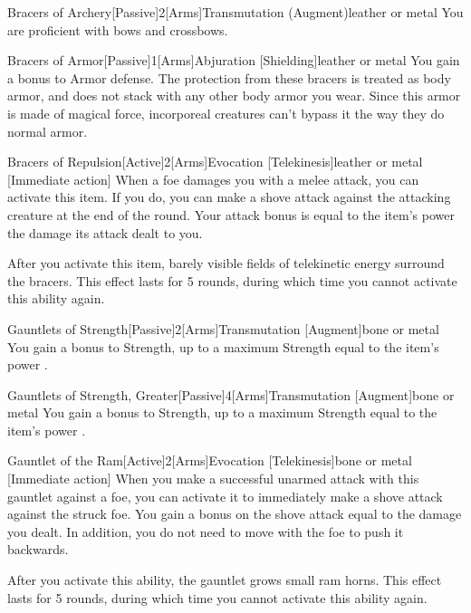 \begin{magicitemdef}{Bracers of Archery}[Passive]{2}[Arms]{Transmutation (Augment)}{leather or metal}
     You are proficient with bows and crossbows.
\end{magicitemdef}

\begin{magicitemdef}{Bracers of Armor}[Passive]{1}[Arms]{Abjuration [Shielding]}{leather or metal}
     You gain a  bonus to Armor defense.
    The protection from these bracers is treated as body armor, and does not stack with any other body armor you wear.
    Since this armor is made of magical force, incorporeal creatures can't bypass it the way they do normal armor.
\end{magicitemdef}

\begin{magicitemdef}{Bracers of Repulsion}[Active]{2}[Arms]{Evocation [Telekinesis]}{leather or metal}
    [Immediate action] When a foe damages you with a melee attack, you can activate this item.
    If you do, you can make a shove attack against the attacking creature at the end of the round.
    Your attack bonus is equal to the item's power \add the damage its attack dealt to you.

    After you activate this item, barely visible fields of telekinetic energy surround the bracers.
    This effect lasts for 5 rounds, during which time you cannot activate this ability again.
\end{magicitemdef}

\begin{magicitemdef}{Gauntlets of Strength}[Passive]{2}[Arms]{Transmutation [Augment]}{bone or metal}
     You gain a  bonus to Strength, up to a maximum Strength equal to the item's power .
\end{magicitemdef}

\begin{magicitemdef}{Gauntlets of Strength, Greater}[Passive]{4}[Arms]{Transmutation [Augment]}{bone or metal}
     You gain a  bonus to Strength, up to a maximum Strength equal to the item's power .
\end{magicitemdef}

\begin{magicitemdef}{Gauntlet of the Ram}[Active]{2}[Arms]{Evocation [Telekinesis]}{bone or metal}
    [Immediate action] When you make a successful unarmed attack with this gauntlet against a foe, you can activate it to immediately make a shove attack against the struck foe.
    You gain a bonus on the shove attack equal to the damage you dealt.
    In addition, you do not need to move with the foe to push it backwards.

    After you activate this ability, the gauntlet grows small ram horns.
    This effect lasts for 5 rounds, during which time you cannot activate this ability again.
\end{magicitemdef}

